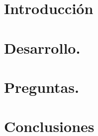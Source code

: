 \documentclass[11pt,letterpaper]{article}
\begin{document}


\tableofcontents

\section{Introducción}




\section{Desarrollo.}


\section{Preguntas.}

\section{Conclusiones}





\printbibliography
\end{document}
